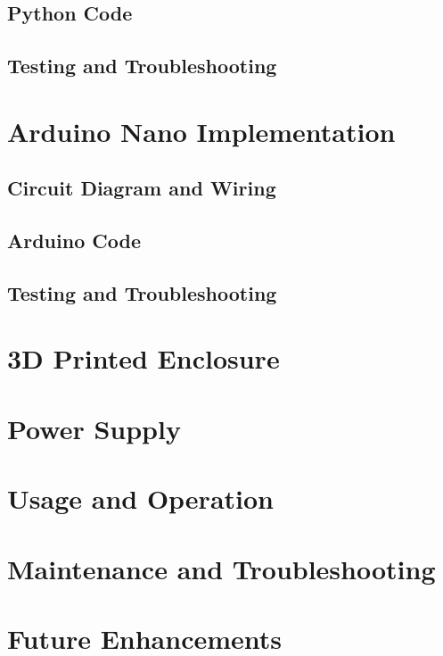 \documentclass{article}
\begin{document}
\begin{multicols}{2}
		\subsection{Python Code}
		\lipsum[26-28]
		
		\subsection{Testing and Troubleshooting}
		\lipsum[29-31]
		
		\section{Arduino Nano Implementation}
		\lipsum[32-34]
		
		\subsection{Circuit Diagram and Wiring}
		\lipsum[35-37]
		
		\subsection{Arduino Code}
		\lipsum[38-40]
		
		\subsection{Testing and Troubleshooting}
		\lipsum[41-43]
		
		\section{3D Printed Enclosure}
		\lipsum[44-46]
		
		\section{Power Supply}
		\lipsum[47-49]
		
		\section{Usage and Operation}
		\lipsum[50-52]
		
		\section{Maintenance and Troubleshooting}
		\lipsum[53-55]
		
		\section{Future Enhancements}
		\lipsum[56-58]
		

\end{multicols}
\end{document}
